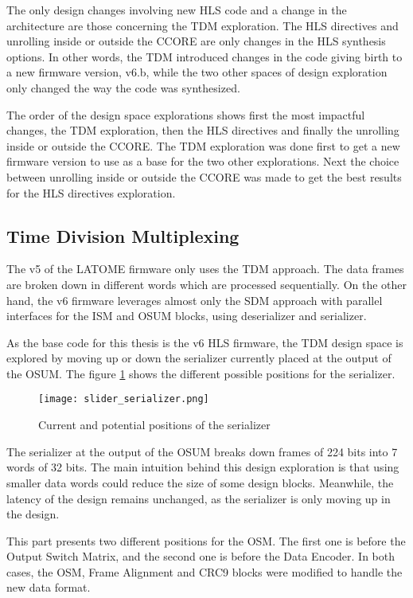 \begin{itemize}
The only design changes involving new HLS code and a change in the architecture are those concerning the TDM exploration. The HLS directives and unrolling inside or outside the CCORE are only changes in the HLS synthesis options. In other words, the TDM introduced changes in the code giving birth to a new firmware version, v6.b, while the two other spaces of design exploration only changed the way the code was synthesized.

The order of the design space explorations shows first the most impactful changes, the TDM exploration, then the HLS directives and finally the unrolling inside or outside the CCORE. The TDM exploration was done first to get a new firmware version to use as a base for the two other explorations. Next the choice between unrolling inside or outside the CCORE was made to get the best results for the HLS directives exploration.

\subsection{Time Division Multiplexing}

The v5 of the LATOME firmware only uses the TDM approach. The data frames are broken down in different words which are processed sequentially. On the other hand, the v6 firmware leverages almost only the SDM approach with parallel interfaces for the ISM and OSUM blocks, using deserializer and serializer.

As the base code for this thesis is the v6 HLS firmware, the TDM design space is explored by moving up or down the serializer currently placed at the output of the OSUM. The figure \ref{fig:slider-serializer} shows the different possible positions for the serializer.

\begin{figure}
    \centering
    \texttt{[image: slider\_serializer.png]}
    \caption{Current and potential positions of the serializer}
    \label{fig:slider-serializer}
\end{figure}

The serializer at the output of the OSUM breaks down frames of 224 bits into 7 words of 32 bits. The main intuition behind this design exploration is that using smaller data words could reduce the size of some design blocks. Meanwhile, the latency of the design remains unchanged, as the serializer is only moving up in the design.

This part presents two different positions for the OSM. The first one is before the Output Switch Matrix, and the second one is before the Data Encoder. In both cases, the OSM, Frame Alignment and CRC9 blocks were modified to handle the new data format.


\end{itemize}
